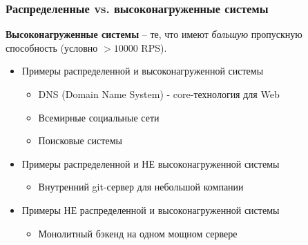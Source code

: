 \documentclass{beamer}
\begin{document}
\begin{frame}
  \frametitle{Распределенные vs. высоконагруженные системы}

  {\bfseries Высоконагруженные системы} – те, что имеют {\itshape большую} пропускную способность (условно $> 10000$ RPS).

 \begin{itemize}
    \item Примеры распределенной и высоконагруженной системы
    \begin{itemize}
        \item DNS (Domain Name System) - core-технология для Web
        \item Всемирные социальные сети
        \item Поисковые системы
    \end{itemize}
    \item Примеры распределенной и НЕ высоконагруженной системы
    \begin{itemize}
        \item Внутренний git-сервер для небольшой компании
    \end{itemize}
    \item Примеры НЕ распределенной и высоконагруженной системы
    \begin{itemize}
        \item Монолитный бэкенд на одном мощном сервере
    \end{itemize}
  \end{itemize}

\end{frame}
\end{document}

